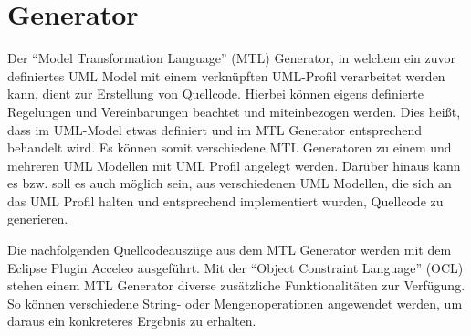 \chapter{Generator}
\label{Generator}
Der “Model Transformation Language” (MTL) Generator, in welchem ein zuvor definiertes UML Model mit einem verknüpften UML-Profil verarbeitet werden kann, dient zur Erstellung von Quellcode. Hierbei können eigens definierte Regelungen und Vereinbarungen beachtet und miteinbezogen werden. Dies heißt, dass im UML-Model etwas definiert und im MTL Generator entsprechend behandelt wird. Es können somit verschiedene MTL Generatoren zu einem und mehreren UML Modellen mit UML Profil angelegt werden. Darüber hinaus kann es bzw. soll es auch möglich sein, aus verschiedenen UML Modellen, die sich an das UML Profil halten und entsprechend implementiert wurden, Quellcode zu generieren.

Die nachfolgenden Quellcodeauszüge aus dem MTL Generator werden mit dem Eclipse Plugin Acceleo ausgeführt. Mit der “Object Constraint Language” (OCL) stehen einem MTL Generator diverse zusätzliche Funktionalitäten zur Verfügung. So können verschiedene String- oder Mengenoperationen angewendet werden, um daraus ein konkreteres Ergebnis zu erhalten.




